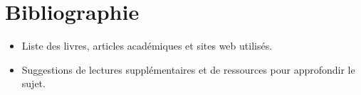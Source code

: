 \documentclass{article}
\begin{document}
\section{Bibliographie}
\begin{itemize}
    \item Liste des livres, articles académiques et sites web utilisés.
    \item Suggestions de lectures supplémentaires et de ressources pour approfondir le sujet.
\end{itemize}
\end{document}
